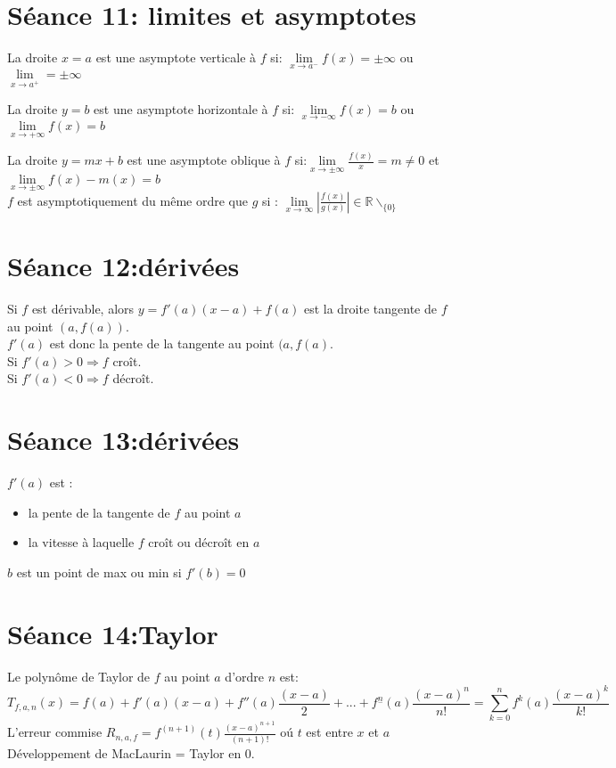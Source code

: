 \documentclass[12pt]{article}
\begin{document}
\section*{S\'eance 11: limites et asymptotes}
La droite $x = a$ est une asymptote verticale \`a $f$ si: $\underset{x\to a^{-}}\lim f(x) = \pm \infty$ ou $\underset{x\to a^{+}}\lim = \pm \infty$ \\ \newline

La droite $y = b$ est une asymptote horizontale \`a $f$ si: $\underset{x\to -\infty}\lim f(x) = b$ ou $\underset{x\to +\infty}\lim f(x) = b$ \\ \newline

La droite $y = mx + b$ est une asymptote oblique \`a $f$ si:\(\underset{x\to \pm \infty}\lim \frac{f(x)}{x} = m \not= 0 \) et \(\underset{x\to \pm \infty}\lim f(x)-m(x) = b \) \\ \newline
$f$ est asymptotiquement du m\^eme ordre que $g$ si : $\underset{x\to \infty}\lim |\frac{f(x)}{g(x)}| \in \mathbb{R}\backslash_{\{0\}}$
\section*{S\'eance 12:d\'eriv\'ees}
Si $f$ est d\'erivable, alors $y = f'(a)(x-a)+f(a)$ est la droite tangente de $f$ au point $(a, f(a))$. \\
\indent $f'(a)$ est donc la pente de la tangente au point $(a, f(a)$. \\
\indent Si $f'(a) > 0 \Rightarrow f$ cro\^it. \\
\indent Si $f'(a) < 0 \Rightarrow f$ d\'ecro\^it.

\section*{S\'eance 13:d\'eriv\'ees}
$f'(a)$ est : 
\begin{itemize}\renewcommand{\labelitemi}{$\bullet$}
\item la pente de la tangente de $f$ au point $a$
\item la vitesse \`a laquelle $f$ cro\^it ou d\'ecro\^it en $a$
\end{itemize}
 
\indent $b$ est un point de max ou min si $f'(b) = 0$
\section*{S\'eance 14:Taylor}
Le polyn\^ome de Taylor de $f$ au point $a$ d'ordre $n$ est: \[T_{f, a, n}(x) = f(a) + f'(a)(x-a)+f''(a)\frac{(x-a)}{2}+...+f^{\underset{-}n}(a)\frac{(x-a)^{n}}{n!} = \sum_{k=0}^{n} f^{k}(a)\frac{(x-a)^{k}}{k!}\]
L'erreur commise $R_{n, a, f} = f^{(n+1)}(t)\frac{(x-a)^{n+1}}{(n+1)!}$ o\'u $t$ est entre $x$ et $a$ \\ \newline
D\'eveloppement de MacLaurin = Taylor en $0$.
\newpage
\end{document}
